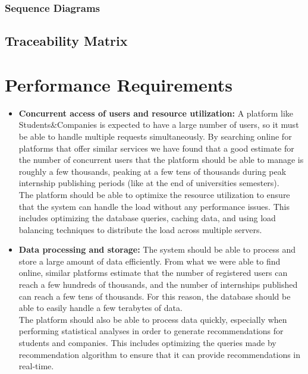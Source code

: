 \subsubsection{Sequence Diagrams}

\subsection{Traceability Matrix}


\section{Performance Requirements}
\begin{itemize}
    \item \textbf{Concurrent access of users and resource utilization:} A platform like Students\&Companies is expected to have a large
    number of users, so it must be able to handle multiple requests simultaneously. By searching online for platforms that offer similar
    services we have found that a good estimate for the number of concurrent users that the platform should be able to manage is roughly
    a few thousands, peaking at a few tens of thousands during peak internship publishing periods (like at the end of universities semesters). \\
    The platform should be able to optimixe the resource utilization to ensure that the system can handle the load without any performance
    issues. This includes optimizing the database queries, caching data, and using load balancing techniques to distribute the load across
    multiple servers.
    
    \item \textbf{Data processing and storage:} The system should be able to process and store a large amount of data efficiently. From 
    what we were able to find online, similar platforms estimate that the number of registered users can reach a few hundreds of thousands,
    and the number of internships published can reach a few tens of thousands. For this reason, the database should be able to easily handle
    a few terabytes of data. \\
    The platform should also be able to process data quickly, especially when performing statistical analyses in order to generate recommendations 
    for students and companies. This includes optimizing the queries made by recommendation algorithm to ensure that it can provide 
    recommendations in real-time.


\end{itemize}
